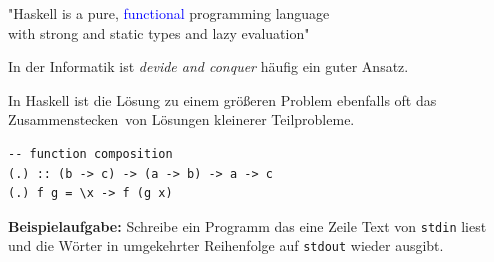 \documentclass[unknownkeysallowed]{beamer}
\begin{document}

\begin{frame}
\begin{center}

  "Haskell is a pure, \textcolor{blue}{functional} programming language \\ with strong and static types and lazy evaluation"
  
\end{center}
\end{frame}


\begin{frame}[fragile]

In der Informatik ist \emph{\glqq devide and conquer\grqq} häufig ein guter Ansatz.
 
In Haskell ist die Lösung zu einem größeren Problem ebenfalls oft das \glqq Zusammenstecken\grqq\
von Lösungen kleinerer Teilprobleme.

\pause

\begin{verbatim}
-- function composition
(.) :: (b -> c) -> (a -> b) -> a -> c
(.) f g = \x -> f (g x)
\end{verbatim}

\bigskip
  
\pause 

\textbf{Beispielaufgabe:} Schreibe ein Programm das eine Zeile Text von \texttt{stdin} liest und die  Wörter in umgekehrter Reihenfolge auf \texttt{stdout} wieder ausgibt.

\end{frame} 

\end{document}
